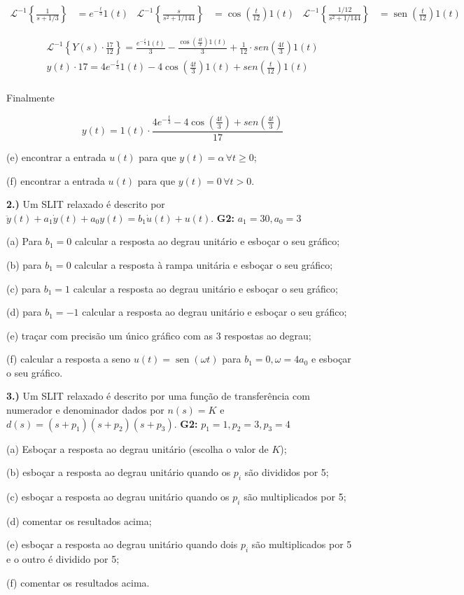 \documentclass{article}
\DeclareMathOperator{\sen}{sen}
\begin{document}
\begin{align*}
    \mathcal{L}^{-1} \left\{\frac{1}{s + 1/3}\right\} &= e^{-\frac{t}{3}}1(t) & \mathcal{L}^{-1} \left\{\frac{s}{s^2 + 1/144}\right\} &= \cos\left(\frac{t}{12}\right)1(t) & \mathcal{L}^{-1} \left\{\frac{1/12}{s^2 + 1/144}\right\} &= \sen\left(\frac{t}{12}\right)1(t)
\end{align*}

\begin{align*}
    \mathcal{L}^{-1} \left\{Y(s) \cdot \frac{17}{12}\right\} = \frac{e^{-\frac{t}{3}}1(t)}{3} - \frac{\cos\left(\frac{4t}{3}\right)1(t)}{3} + \frac{1}{12}\cdot sen\left(\frac{4t}{3}\right)1(t)\\
    y(t) \cdot 17 = 4e^{-\frac{t}{3}}1(t) - 4\cos\left(\frac{4t}{3}\right)1(t) + sen\left(\frac{t}{12}\right)1(t)\\
\end{align*}

Finalmente

\[y(t) = 1(t)\cdot\frac{4e^{-\frac{t}{3}} - 4\cos\left(\frac{4t}{3}\right) + sen\left(\frac{4t}{3}\right)}{17}\]

(e) encontrar a entrada $u(t)$ para que $y(t) = \alpha\,\forall t \geq 0$;

(f) encontrar a entrada $u(t)$ para que  $y(t) = 0\,\forall t > 0$.


\vspace{\baselineskip}


\textbf{2.)} Um SLIT relaxado é descrito por $\ddot{y}(t) + a_1\dot{y}(t) + a_0y(t) = b_1\dot{u}(t) + u(t)$.
\textbf{G2:} $a_1 = 30, a_0 = 3$

(a) Para $b_1 = 0$ calcular a resposta ao degrau unitário e esboçar o seu gráfico;

(b) para $b_1 = 0$ calcular a resposta à rampa unitária e esboçar o seu gráfico;

(c) para $b_1 = 1$ calcular a resposta ao degrau unitário e esboçar o seu gráfico;

(d) para $b_1 = -1$ calcular a resposta ao degrau unitário e esboçar o seu gráfico;

(e) traçar com precisão um único gráfico com as 3 respostas ao degrau;

(f) calcular a resposta a seno $u(t) = \sen(\omega t)$ para $b_1 = 0, \omega = 4a_0$ e esboçar o seu gráfico.


\vspace{\baselineskip}

\textbf{3.)} Um SLIT relaxado é descrito por uma função de transferência com numerador e denominador dados por $n(s) = K$ e $d(s) = (s + p_1)(s + p_2)(s + p_3)$.
\textbf{G2:} $p_1 = 1, p_2 = 3, p_3 = 4$

(a) Esboçar a resposta ao degrau unitário (escolha o valor de $K$);

(b) esboçar a resposta ao degrau unitário quando os $p_i$ são divididos por 5;

(c) esboçar a resposta ao degrau unitário quando os $p_i$ são multiplicados por 5;

(d) comentar os resultados acima;

(e) esboçar a resposta ao degrau unitário quando dois $p_i$ são multiplicados por 5 e o outro é dividido por 5;

(f) comentar os resultados acima.
\end{document}
